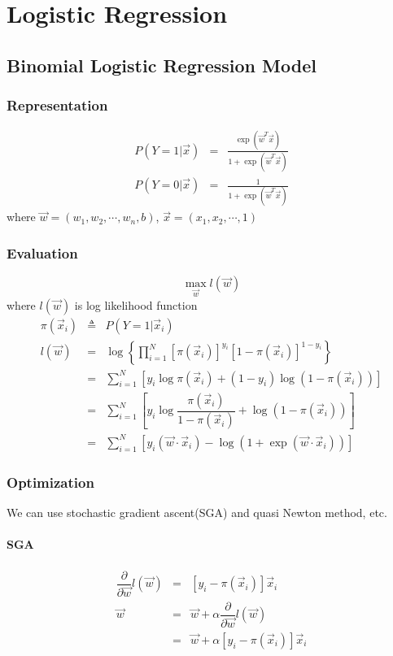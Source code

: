 \chapter{Logistic Regression}


\section{Binomial Logistic Regression Model}


\subsection{Representation}

\begin{eqnarray}
  P(Y=1|\vec{x}) &=& \frac{\exp(\vec{w}^T\vec{x})}{1+\exp(\vec{w}^T\vec{x})} \\
  P(Y=0|\vec{x}) &=& \frac{1}{1+\exp(\vec{w}^T\vec{x})}
\end{eqnarray}
where $\vec{w}=(w_1, w_2,\cdots, w_n, b)$, $\vec{x}=(x_1,x_2,\cdots, 1)$


\subsection{Evaluation}
\begin{equation}
\max_{\vec{w}} l(\vec{w})
\end{equation}
where $l(\vec{w})$ is log likelihood function
\begin{eqnarray*}
\pi(\vec{x}_i) & \triangleq & P(Y=1|\vec{x}_i) \\
l(\vec{w}) &=& \log\left\{\prod\limits_{i=1}^N{\left[\pi(\vec{x}_i)\right]^{y_i}\left[1-\pi(\vec{x}_i)\right]^{1-y_i}}\right\} \\
           &=& \sum\limits_{i=1}^N\left[y_i\log\pi(\vec{x}_i)+(1-y_i)\log(1-\pi(\vec{x}_i))\right] \\
		   &=& \sum\limits_{i=1}^N\left[y_i\log\dfrac{\pi(\vec{x}_i)}{1-\pi(\vec{x}_i)}+\log(1-\pi(\vec{x}_i))\right] \\
		   &=& \sum\limits_{i=1}^N\left[y_i(\vec{w}\cdot\vec{x}_i)-\log(1+\exp(\vec{w}\cdot\vec{x}_i))\right]
\end{eqnarray*}


\subsection{Optimization}
We can use stochastic gradient ascent(SGA) and quasi Newton method, etc.


\subsubsection{SGA}
\begin{eqnarray}
\dfrac{\partial}{\partial \vec{w}}l(\vec{w}) &=& \left[y_i - \pi(\vec{x}_i) \right]\vec{x}_i \\
\vec{w} &=& \vec{w}+\alpha\dfrac{\partial}{\partial \vec{w}}l(\vec{w}) \\
        &=& \vec{w} + \alpha\left[y_i - \pi(\vec{x}_i) \right]\vec{x}_i
\end{eqnarray}
